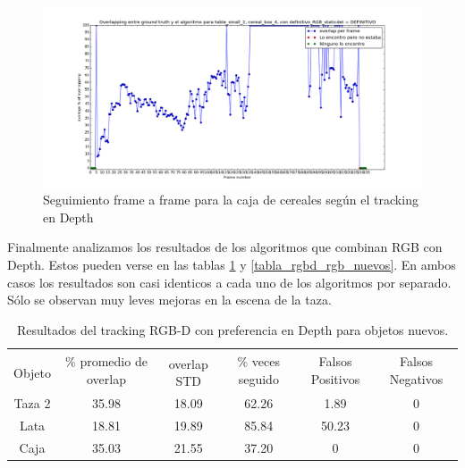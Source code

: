 \begin{figure}
	\centering
	\includegraphics[width=\textwidth]{img/seguimientoframeaframe-depth-nuevo-caja.png}
	\caption{Seguimiento frame a frame para la caja de cereales según el tracking en Depth}
	\label{frame_frame_d_nuevo}
\end{figure}


Finalmente analizamos los resultados de los algoritmos que combinan RGB con Depth. Estos pueden verse en las tablas \ref{tabla_rgbd_d_nuevos} y \ref{tabla_rgbd_rgb_nuevos}. En ambos casos los resultados son casi identicos a cada uno de los algoritmos por separado. Sólo se observan muy leves mejoras en la escena de la taza. 

\begin{table}[h]
    \begin{tabular}{|c|c|c|c|c|c|}
    \hline
    & \multirow{2}{2.4cm}{\% promedio de overlap} & & \multirow{2}{2cm}{\% veces seguido} & \multirow{2}{1.6cm}{Falsos Positivos} & \multirow{2}{1.6cm}{Falsos Negativos}\\
	Objeto & & overlap STD & & &\\
    \hline
    Taza 2  & 35.98      & 18.09       & 62.26             & 1.89             & 0\\
    \hline
    Lata    & 18.81      & 19.89       & 85.84             & 50.23            & 0\\
    \hline
    Caja    & 35.03      & 21.55       & 37.20             & 0                & 0\\
    \hline
    \end{tabular}
\caption{Resultados del tracking RGB-D con preferencia en Depth para objetos nuevos.}
\label{tabla_rgbd_d_nuevos}
\end{table}

